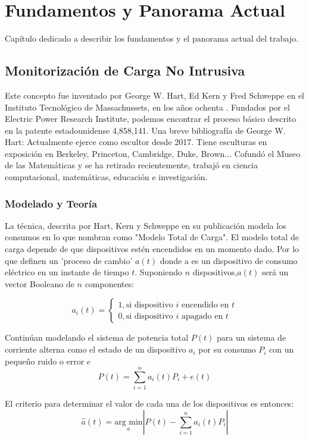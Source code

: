 \chapter{Fundamentos y Panorama Actual}
\label{ch:fundamentos}
Capítulo dedicado a describir los fundamentos y el panorama actual del trabajo. 

\section{Monitorización de Carga No Intrusiva}
\label{se:MonitorizaciondeCargaNoIntrusiva}
Este concepto fue inventado por George W. Hart, Ed Kern y Fred Schweppe en el Instituto Tecnológico de Massachussets, en los años ochenta \autocite{192069}. Fundados por el Electric Power Research Institute, podemos encontrar el proceso básico descrito en la patente estadounidense 4,858,141.
Una breve bibliografía de George W. Hart: Actualmente ejerce como escultor desde 2017. Tiene esculturas en exposición en Berkeley, Princeton, Cambridge, Duke, Brown... Cofundó el Museo de las Matemáticas y se ha retirado recientemente, trabajó en ciencia computacional, matemáticas, educación e investigación.

\subsection{Modelado y Teoría}
\label{sse:ModeladoyTeoria}
La técnica, descrita por Hart, Kern y Schweppe en su publicación modela los consumos en lo que nombran como "Modelo Total de Carga". El modelo total de carga depende de que dispositivos estén encendidos en un momento dado. Por lo que definen un 'proceso de cambio'
$a(t)$ donde a es un dispositivo de consumo eléctrico en un instante de tiempo $t$. Suponiendo $n$ dispositivos,$a(t)$ será un vector Booleano de $n$ componentes:

$$
a_i(t)=
	\left\{
	\begin{array}{l}
	1,\text{si dispositivo } i \text{ encendido en } t\\
	0, \text{si dispositivo } i \text{ apagado en } t
	\end{array}
	\right.
$$

Continúan modelando el sistema de potencia total $P(t)$ para un sistema de corriente alterna como el estado de un dispositivo $a_i$ por su consumo $P_i$ con un pequeño ruido o error $e$
$$
P(t)=\sum_{i=1}^{n} a_i(t)P_i+e(t)
$$

El criterio para determinar el valor de cada una de los dispositivos es entonces:
$$
\hat{a}(t) = \underset{a}{\text{arg min}} \left| P(t) - \sum_{i=1}^{n} a_i(t)P_i \right|
$$

